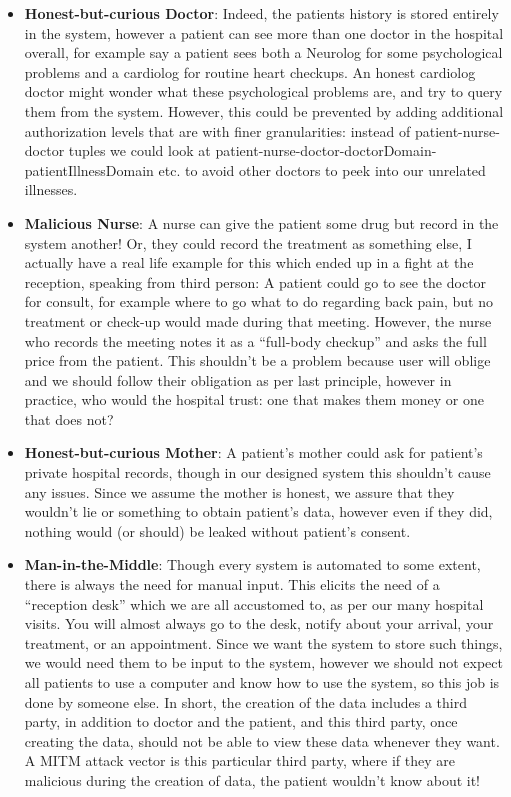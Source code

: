 \documentclass[12pt,reqno]{amsart}
\begin{document}
\begin{itemize}
	\item \textbf{Honest-but-curious Doctor}: Indeed, the patients history is stored entirely in the system, however a patient can see more than one doctor in the hospital overall, for example say a patient sees both a Neurolog for some psychological problems and a cardiolog for routine heart checkups. An honest cardiolog doctor might wonder what these psychological problems are, and try to query them from the system. However, this could be prevented by adding additional authorization levels that are with finer granularities: instead of patient-nurse-doctor tuples we could look at patient-nurse-doctor-doctorDomain-patientIllnessDomain etc. to avoid other doctors to peek into our unrelated illnesses.
	\item \textbf{Malicious Nurse}: A nurse can give the patient some drug but record in the system another! Or, they could record the treatment as something else, I actually have a real life example for this which ended up in a fight at the reception, speaking from third person: A patient could go to see the doctor for consult, for example where to go what to do regarding back pain, but no treatment or check-up would made during that meeting. However, the nurse who records the meeting notes it as a ``full-body checkup'' and asks the full price from the patient. This shouldn't be a problem because user will oblige and we should follow their obligation as per last principle, however in practice, who would the hospital trust: one that makes them money or one that does not?
	\item \textbf{Honest-but-curious Mother}: A patient's mother could ask for patient's private hospital records, though in our designed system this shouldn't cause any issues. Since we assume the mother is honest, we assure that they wouldn't lie or something to obtain patient's data, however even if they did, nothing would (or should) be leaked without patient's consent.
	\item \textbf{Man-in-the-Middle}: Though every system is automated to some extent, there is always the need for manual input. This elicits the need of a ``reception desk'' which we are all accustomed to, as per our many hospital visits. You will almost always go to the desk, notify about your arrival, your treatment, or an appointment. Since we want the system to store such things, we would need them to be input to the system, however we should not expect all patients to use a computer and know how to use the system, so this job is done by someone else. In short, the creation of the data includes a third party, in addition to doctor and the patient, and this third party, once creating the data, should not be able to view these data whenever they want. A MITM attack vector is this particular third party, where if they are malicious during the creation of data, the patient wouldn't know about it!
\end{itemize}
\end{document}
